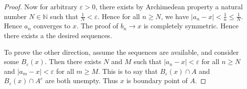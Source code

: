 \begin{enumerate}
\begin{proof}
	Now for arbitrary $\varepsilon>0$, there exists by Archimedean property a natural number $N \in \mathbb{N} $ such that $\frac{1}{N}<\varepsilon$. Hence for all $n \ge N$, we have $|a_n - x| < \frac{1}{n} \le \frac{1}{N}$. Hence $a_n$ converges to $x$. The proof of $b_n \to x$ is completely symmetric. Hence there exists a the desired sequences.

	To prove the other direction, assume the sequences are available, and consider some $B_\varepsilon(x)$. Then there exists $N$ and $M$ such that $|a_n - x| <\varepsilon$ for all $n\ge N$ and $|a_m - x| < \varepsilon$ for all $m \ge M$. This is to say that $B_\varepsilon(x) \cap A$ and $B_\varepsilon(x) \cap A^c$ are both unempty. Thus $x$ is boundary point of $A$.
\end{proof}

\end{enumerate}
